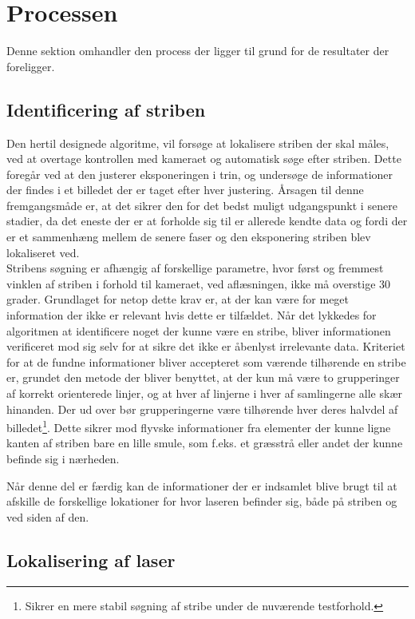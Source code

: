 \section{Processen}

Denne sektion omhandler den process der ligger til grund for de resultater der foreligger.

\subsection{Identificering af striben}

Den hertil designede algoritme, vil forsøge at lokalisere striben der skal måles, ved at overtage kontrollen med kameraet og automatisk søge efter striben.
Dette foregår ved at den justerer eksponeringen i trin, og undersøge de informationer der findes i et billedet der er taget efter hver justering.
Årsagen til denne fremgangsmåde er, at det sikrer den for det bedst muligt udgangspunkt i senere stadier, da det eneste der er at forholde sig til er allerede kendte data og fordi der er et sammenhæng mellem de senere faser og den eksponering striben blev lokaliseret ved.
\\
Stribens søgning er afhængig af forskellige parametre, hvor først og fremmest vinklen af striben i forhold til kameraet, ved aflæsningen, ikke må overstige 30 grader. Grundlaget for netop dette krav er, at der kan være for meget information der ikke er relevant hvis dette er tilfældet.
Når det lykkedes for algoritmen at identificere noget der kunne være en stribe, bliver informationen verificeret mod sig selv for at sikre det ikke er åbenlyst irrelevante data. Kriteriet for at de fundne informationer bliver accepteret som værende tilhørende en stribe er, grundet den metode der bliver benyttet, at der kun må være to grupperinger af korrekt orienterede linjer, og at hver af linjerne i hver af samlingerne alle skær hinanden. Der ud over bør grupperingerne være tilhørende hver deres halvdel af billedet\footnote{Sikrer en mere stabil søgning af stribe under de nuværende testforhold.}.
Dette sikrer mod flyvske informationer fra elementer der kunne ligne kanten af striben bare en lille smule, som f.eks. et græsstrå eller andet der kunne befinde sig i nærheden.

Når denne del er færdig kan de informationer der er indsamlet blive brugt til at afskille de forskellige lokationer for hvor laseren befinder sig, både på striben og ved siden af den.

\subsection{Lokalisering af laser}

